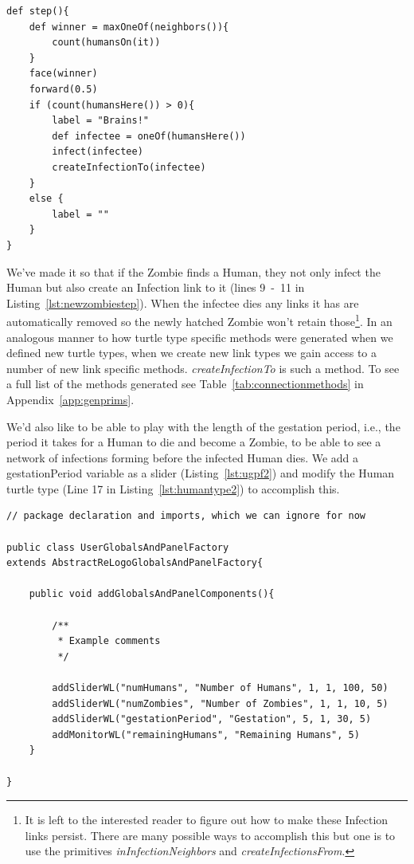 \documentclass[11pt]{amsart}
\begin{document}
\noindent\begin{minipage}[h]{\textwidth}
\vspace{.2in}
\begin{lstlisting}
def step(){
	def winner = maxOneOf(neighbors()){
		count(humansOn(it))
	}
	face(winner)
	forward(0.5)
	if (count(humansHere()) > 0){
		label = "Brains!"
		def infectee = oneOf(humansHere()) 
		infect(infectee)
		createInfectionTo(infectee)
	}
	else {
		label = ""
	}
}
\end{lstlisting}
\vspace{.2in}
\end{minipage}
We've made it so that if the Zombie finds a Human, they not only infect the Human but also create an Infection link to it (lines 9~-~11 in Listing~\ref{lst:newzombiestep}). When the infectee dies any links it has are automatically removed so the newly hatched Zombie won't retain those\footnote{It is left to the interested reader to figure out how to make these Infection links persist. There are many possible ways to accomplish this but one is to use the primitives \emph{inInfectionNeighbors} and \emph{createInfectionsFrom}.}. In an analogous manner to how turtle type specific methods were generated when we defined new turtle types, when we create new link types we gain access to a number of new link specific methods. \emph{createInfectionTo} is such a method. To see a full list of the methods generated see Table~\ref{tab:connectionmethods} in Appendix~\ref{app:genprims}.

We'd also like to be able to play with the length of the gestation period, i.e., the period it takes for a Human to die and become a Zombie, to be able to see a network of infections forming before the infected Human dies. We add a gestationPeriod variable as a slider (Listing~\ref{lst:ugpf2}) and modify the Human turtle type (Line 17 in Listing~\ref{lst:humantype2}) to accomplish this.

\noindent\begin{minipage}[h]{\textwidth}
\vspace{.2in}
\lstset{language=java,caption=The UserGlobalsAndPanelFactory class with a gestationPeriod variable as a slider.,label=lst:ugpf2}
\begin{lstlisting}
// package declaration and imports, which we can ignore for now

public class UserGlobalsAndPanelFactory
extends AbstractReLogoGlobalsAndPanelFactory{

	public void addGlobalsAndPanelComponents(){
		
		/**
		 * Example comments
		 */
		
		addSliderWL("numHumans", "Number of Humans", 1, 1, 100, 50)
		addSliderWL("numZombies", "Number of Zombies", 1, 1, 10, 5)
		addSliderWL("gestationPeriod", "Gestation", 5, 1, 30, 5)
		addMonitorWL("remainingHumans", "Remaining Humans", 5)
	}
	
}
\end{lstlisting}
\vspace{.2in}
\end{minipage}
\end{document}
